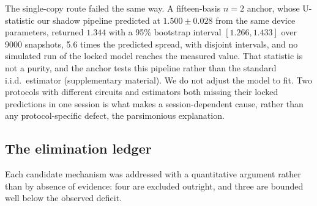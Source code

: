 The single-copy route failed the same way. A fifteen-basis \(n = 2\)
anchor, whose U-statistic our shadow pipeline predicted at
\(1.500 \pm 0.028\) from the same device parameters, returned \(1.344\)
with a 95\% bootstrap interval \([1.266, 1.433]\) over 9000 snapshots,
5.6 times the predicted spread, with disjoint intervals, and no simulated
run of the locked model reaches the measured value. That statistic is not
a purity, and the anchor tests this pipeline rather than the standard
i.i.d.\ estimator (supplementary material). We do not adjust the model to
fit. Two protocols with different circuits and estimators both missing
their locked predictions in one session is what makes a session-dependent
cause, rather than any protocol-specific defect, the parsimonious
explanation.

\hypertarget{the-elimination-ledger}{%
\subsection{The elimination
ledger}\label{the-elimination-ledger}}

Each candidate mechanism was addressed with a quantitative argument
rather than by absence of evidence: four are excluded outright, and three
are bounded well below the observed deficit.

